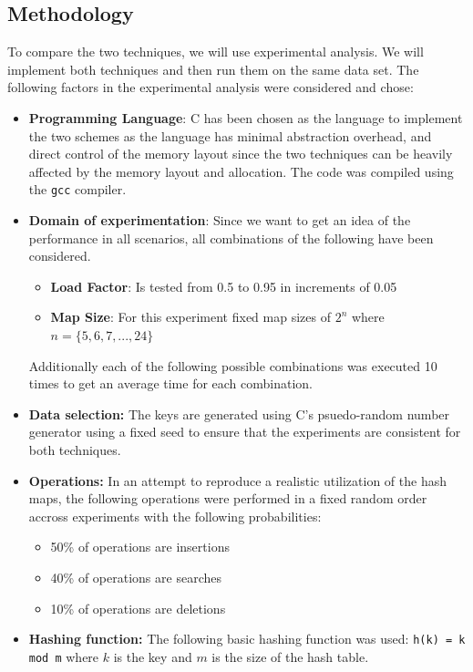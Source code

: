 \documentclass{article}
\begin{document}
\subsection*{Methodology}
To compare the two techniques, we will use experimental analysis. We will implement both techniques and then run them on the same data set. The following factors in the experimental analysis were considered and chose: 
\begin{itemize}
    \item \textbf{Programming Language}: C has been chosen as the language to implement the two schemes as the language has minimal abstraction overhead, and direct control of the memory layout since the two techniques can be heavily affected by the memory layout and allocation. The code was compiled using the \texttt{gcc} compiler.
    \item \textbf{Domain of experimentation}: Since we want to get an idea of the performance in all scenarios, all combinations of the following have been considered. \begin{itemize}
        \item \textbf{Load Factor}: Is tested from 0.5 to 0.95 in increments of 0.05
        \item \textbf{Map Size}: For this experiment fixed map sizes of $2^{n}$ where $n=\{5,6,7,...,24\}$ 
    \end{itemize}
    Additionally each of the following possible combinations was executed 10 times to get an average time for each combination.
    \item \textbf{Data selection:} The keys are generated using C's psuedo-random number generator using a fixed seed to ensure that the experiments are consistent for both techniques. 
    \item \textbf{Operations:} In an attempt to reproduce a realistic utilization of the hash maps, the following operations were performed in a fixed random order accross experiments with the following probabilities:
    \begin{itemize}
        \item 50\% of operations are insertions
        \item 40\% of operations are searches
        \item 10\% of operations are deletions
    \end{itemize}
    \item \textbf{Hashing function:} The following basic hashing function was used: \texttt{h(k) = k mod m} where $k$ is the key and $m$ is the size of the hash table. 

\end{itemize}
\end{document}
